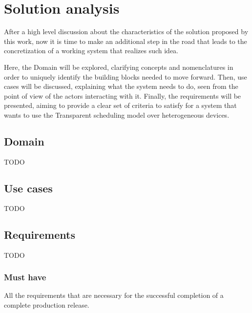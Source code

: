 \section{Solution analysis}
After a high level discussion about the characteristics of the solution proposed by this work, now it is time to make an additional step in the road that leads to the concretization of a working system that realizes such idea.

Here, the Domain will be explored, clarifying concepts and nomenclatures in order to uniquely identify the building blocks needed to move forward.
Then, use cases will be discussed, explaining what the system needs to do, seen from the point of view of the actors interacting with it.
Finally, the requirements will be presented, aiming to provide a clear set of criteria to satisfy for a system that wants to use the Transparent scheduling model over heterogeneous devices.

\subsection{Domain}
TODO

\subsection{Use cases}
TODO



\subsection{Requirements}
TODO

\subsubsection{Must have}
All the requirements that are necessary for the successful completion of a complete production release.


